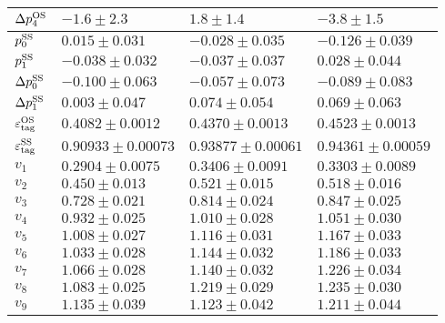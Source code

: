\begin{table}
\begin{tabular}{llll}
      $\Delta p_{4}^{\rm OS}$      & $-1.6\pm2.3$          & $1.8\pm1.4$           & $-3.8\pm1.5$      \\    
      \midrule
      $p_{0}^{\rm SS}$             & $0.015\pm0.031$       & $-0.028\pm0.035$      & $-0.126\pm0.039$  \\  
      $p_{1}^{\rm SS}$             & $-0.038\pm0.032$      & $-0.037\pm0.037$      & $0.028\pm0.044$   \\    
      $\Delta p_{0}^{\rm SS}$      & $-0.100\pm0.063$      & $-0.057\pm0.073$      & $-0.089\pm0.083$  \\    
      $\Delta p_{1}^{\rm SS}$      & $0.003\pm0.047$       & $0.074\pm0.054$       & $0.069\pm0.063$   \\ 
      \midrule
      $\varepsilon_{\rm tag}^{\rm OS}$ & $0.4082\pm0.0012$     & $0.4370\pm0.0013$     & $0.4523\pm0.0013$ \\    
      $\varepsilon_{\rm tag}^{\rm SS}$ & $0.90933\pm0.00073$   & $0.93877\pm0.00061$   & $0.94361\pm0.00059$ \\
      \midrule
      $v_{1}$               & $0.2904\pm0.0075$     & $0.3406\pm0.0091$     & $0.3303\pm0.0089$ \\    
      $v_{2}$               & $0.450\pm0.013$       & $0.521\pm0.015$       & $0.518\pm0.016$   \\    
      $v_{3}$               & $0.728\pm0.021$       & $0.814\pm0.024$       & $0.847\pm0.025$   \\    
      $v_{4}$               & $0.932\pm0.025$       & $1.010\pm0.028$       & $1.051\pm0.030$   \\    
      $v_{5}$               & $1.008\pm0.027$       & $1.116\pm0.031$       & $1.167\pm0.033$   \\    
      $v_{6}$               & $1.033\pm0.028$       & $1.144\pm0.032$       & $1.186\pm0.033$   \\    
      $v_{7}$               & $1.066\pm0.028$       & $1.140\pm0.032$       & $1.226\pm0.034$   \\    
      $v_{8}$               & $1.083\pm0.025$       & $1.219\pm0.029$       & $1.235\pm0.030$   \\    
      $v_{9}$               & $1.135\pm0.039$       & $1.123\pm0.042$       & $1.211\pm0.044$   \\    
      \bottomrule
    \end{tabular}
\end{table}

